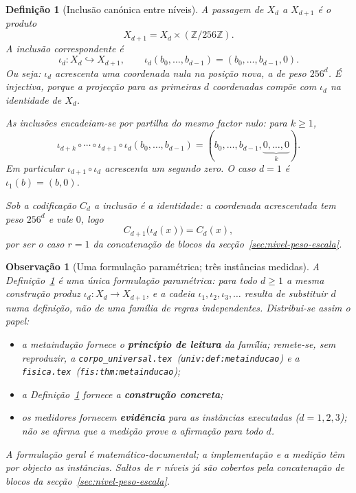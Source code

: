 \documentclass[11pt,a4paper]{article}
\newtheorem{definicao}{Definição}
\newtheorem{observacao}{Observação}
\newcommand{\code}[1]{\texttt{\small #1}}
\begin{document}
\begin{definicao}[Inclusão canónica entre níveis]
\label{def:iota-d}
A passagem de \(X_d\) a \(X_{d+1}\) é o produto
\[
X_{d+1}=X_d\times(\mathbb Z/256\mathbb Z).
\]
A inclusão correspondente é
\[
\iota_d:X_d\hookrightarrow X_{d+1},
\qquad
\iota_d(b_0,\dots,b_{d-1})=(b_0,\dots,b_{d-1},0).
\]
Ou seja: \(\iota_d\) acrescenta uma coordenada nula na posição nova, a de peso
\(256^d\). É injectiva, porque a projecção para as primeiras \(d\) coordenadas
compõe com \(\iota_d\) na identidade de \(X_d\).

As inclusões encadeiam-se por partilha do mesmo factor nulo: para \(k\ge 1\),
\[
\iota_{d+k}\circ\cdots\circ\iota_{d+1}\circ\iota_d(b_0,\dots,b_{d-1})
=(b_0,\dots,b_{d-1},\underbrace{0,\dots,0}_{k}).
\]
Em particular \(\iota_{d+1}\circ\iota_d\) acrescenta um segundo zero. O caso
\(d=1\) é \(\iota_1(b)=(b,0)\).

Sob a codificação \(C_d\) a inclusão é a identidade: a coordenada acrescentada
tem peso \(256^d\) e vale \(0\), logo
\[
C_{d+1}\bigl(\iota_d(x)\bigr)=C_d(x),
\]
por ser o caso \(r=1\) da concatenação de blocos da secção~\ref{sec:nivel-peso-escala}.
\end{definicao}

\begin{observacao}[Uma formulação paramétrica; três instâncias medidas]
\label{obs:iota-familia}
A Definição~\ref{def:iota-d} é uma \emph{única} formulação paramétrica: para todo
\(d\ge 1\) a mesma construção produz \(\iota_d\colon X_d\to X_{d+1}\), e a cadeia
\(\iota_1,\iota_2,\iota_3,\dots\) resulta de substituir \(d\) numa definição, não de
uma família de regras independentes. Distribui-se assim o papel:
\begin{itemize}\itemsep3pt
\item a metaindução fornece o \textbf{princípio de leitura} da família; remete-se,
  sem reproduzir, a \texttt{corpo\_universal.tex}~(\code{univ:def:metainducao}) e
  a \texttt{fisica.tex}~(\code{fis:thm:metainducao});
\item a Definição~\ref{def:iota-d} fornece a \textbf{construção concreta};
\item os medidores fornecem \textbf{evidência} para as instâncias executadas
  (\(d=1,2,3\)); não se afirma que a medição prove a afirmação para todo \(d\).
\end{itemize}
A formulação geral é matemático-documental; a implementação e a medição têm por
objecto as instâncias. Saltos de \(r\) níveis já são cobertos pela concatenação de
blocos da secção~\ref{sec:nivel-peso-escala}.
\end{observacao}
\end{document}
